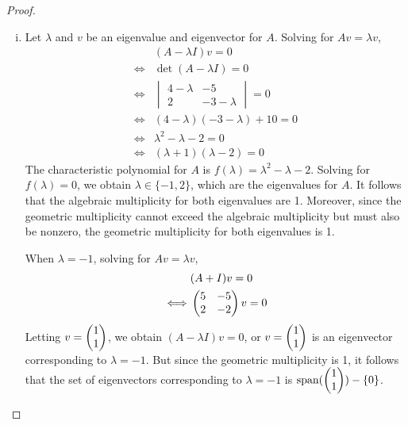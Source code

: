 \begin{proof}
    \renewcommand{\qedsymbol}{$\blacksquare$}
    \begin{enumerate}[(i)]
        \item Let $\lambda$ and $v$ be an eigenvalue and eigenvector for $A$.
              Solving for $Av=\lambda v$,
              \[
                  \begin{aligned}
                       & (A-\lambda I)v=0             \\
                      \iff
                       & \det(A-\lambda I)=0          \\
                      \iff
                       & \begin{vmatrix}
                             4-\lambda & -5         \\
                             2         & -3-\lambda
                         \end{vmatrix}=0       \\
                      \iff
                       & (4-\lambda)(-3-\lambda)+10=0 \\
                      \iff
                       & \lambda^2-\lambda-2=0        \\
                      \iff
                       & (\lambda+1)(\lambda-2)=0
                  \end{aligned}
              \]
              The characteristic polynomial for $A$ is $f(\lambda)=\lambda^2-\lambda-2$.
              Solving for $f(\lambda)=0$, we obtain $\lambda\in\{-1,2\}$, which are the eigenvalues for $A$.
              It follows that the algebraic multiplicity for both eigenvalues are 1.
              Moreover, since the geometric multiplicity cannot exceed the algebraic multiplicity but must also be nonzero, the geometric multiplicity for both eigenvalues is 1.

              When $\lambda=-1$, solving for $Av=\lambda v$,
              \[
                  \begin{aligned}
                       & (A+I)v=0                    \\
                      \iff
                       & \begin{pmatrix} 5 &-5\\ 2 &-2 \end{pmatrix}v=0
                  \end{aligned}
              \]
              Letting $v=\begin{pmatrix} 1\\ 1\end{pmatrix}$, we obtain $(A-\lambda I)v=0$, or $v=\begin{pmatrix} 1\\ 1\end{pmatrix}$ is an eigenvector corresponding to $\lambda=-1$.
              But since the geometric multiplicity is 1, it follows that the set of eigenvectors corresponding to $\lambda=-1$ is $\textnormal{span}(\begin{pmatrix} 1\\ 1\end{pmatrix}) -\{0\}$.


\end{enumerate}
\end{proof}
